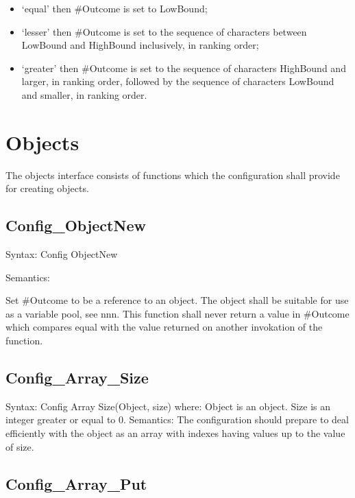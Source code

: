 \begin{itemize}
\item
  `equal' then \#Outcome is set to LowBound;
\item
  `lesser' then \#Outcome is set to the sequence of characters between
  LowBound and HighBound inclusively, in ranking order;
\item
  `greater' then \#Outcome is set to the sequence of characters
  HighBound and larger, in ranking order, followed by the sequence of
  characters LowBound and smaller, in ranking order.
\end{itemize}

\hypertarget{objects}{%
\section{Objects}\label{objects}}

The objects interface consists of functions which the configuration
shall provide for creating objects.

\hypertarget{config_objectnew}{%
\subsection{Config\_ObjectNew}\label{config_objectnew}}

Syntax: Config ObjectNew

Semantics:

Set \#Outcome to be a reference to an object. The object shall be
suitable for use as a variable pool, see nnn. This function shall never
return a value in \#Outcome which compares equal with the value returned
on another invokation of the function.

\hypertarget{config_array_size}{%
\subsection{Config\_Array\_Size}\label{config_array_size}}

Syntax: Config Array Size(Object, size) where: Object is an object. Size
is an integer greater or equal to 0. Semantics: The configuration should
prepare to deal efficiently with the object as an array with indexes
having values up to the value of size.

\hypertarget{config_array_put}{%
\subsection{Config\_Array\_Put}\label{config_array_put}}

